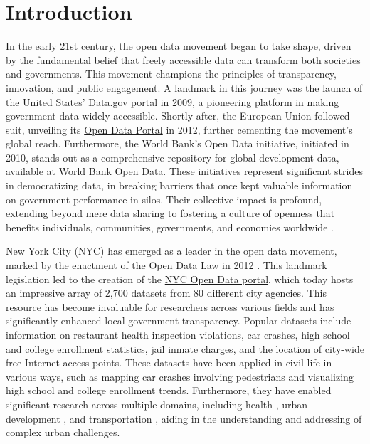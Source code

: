 \documentclass[linenumber]{jdsart}
\begin{document}
\section{Introduction} 
\label{sec:intro}

In the early 21st century, the open data movement began 
to take shape, driven by the fundamental belief that 
freely accessible data can transform both societies and 
governments. This movement champions the principles
of transparency, innovation, and public engagement. 
A landmark in this journey was the launch of the United States'
\href{https://www.data.gov}{Data.gov} portal in 2009, a pioneering
platform in making government data widely accessible. Shortly after,
the European Union followed suit, unveiling its
\href{https://data.europa.eu/euodp}{Open Data Portal} in 2012, further
cementing the movement's global reach. Furthermore, the World Bank's Open
Data initiative, initiated in 2010, stands out as a comprehensive
repository for global development data, available at
\href{https://data.worldbank.org}{World Bank Open Data}. 
These initiatives represent significant strides in democratizing data, 
in breaking barriers that once kept valuable information 
on government performance in silos. Their collective impact 
is profound, extending beyond mere data sharing to 
fostering a culture of openness that benefits individuals, 
communities, governments, and economies worldwide 
\citep{barns2016mine, wang2016adoption}.


New York City (NYC) has emerged as a leader in the open data movement,
marked by the enactment of the Open Data Law in 2012
\citep{zuiderwijk2014open}. This landmark legislation led to the
creation of the \href{https://opendata.cityofnewyork.us}{NYC Open Data
  portal}, which today hosts an impressive array of 2,700 datasets
from 80 different city agencies. This resource has become invaluable
for researchers across various fields and has significantly enhanced
local government transparency. Popular datasets include information on
restaurant health inspection violations, car crashes, high school and
college enrollment statistics, jail inmate charges, and the location
of city-wide free Internet access points. These datasets have been
applied in civil life in various ways, such as mapping car crashes
involving pedestrians and visualizing high school and college
enrollment trends. Furthermore, they have enabled significant research
across multiple domains, including health \citep{cantor2018facets,
  shankar2021data}, urban development \citep{neves2020impacts}, and
transportation \citep{gerte2019understanding}, aiding in the
understanding and addressing of complex urban challenges.
\end{document}
